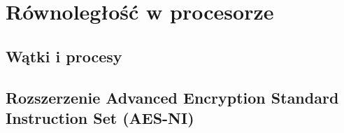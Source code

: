 \chapter{Równoległość w procesorze}

\section{Wątki i procesy}

\section{Rozszerzenie Advanced Encryption Standard Instruction Set (AES-NI)}

